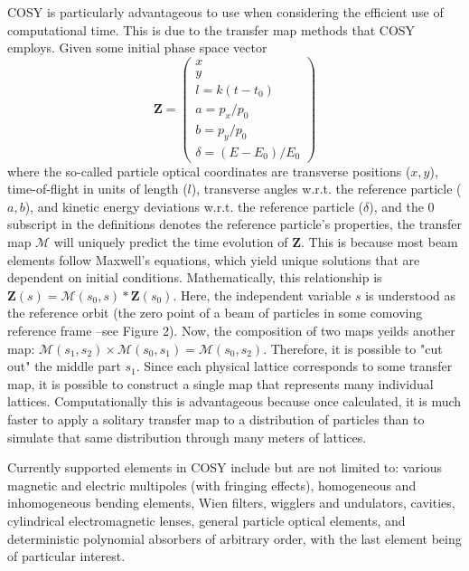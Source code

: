 \documentclass{jacow}
\begin{document}
COSY is particularly advantageous to use when considering the efficient use of computational time. This is due to the transfer map methods that COSY employs. Given some initial phase space vector
\begin{equation}
\mathbf{Z}=
\begin{pmatrix}
x\\ y\\ l=k(t-t_0)\\a=p_x/p_0\\b=p_y/p_0\\  \delta = (E-E_0)/E_0
\end{pmatrix}
\end{equation}
where the so-called particle optical coordinates are transverse positions ($x, y$), time-of-flight in units of length ($l$), transverse angles w.r.t. the reference particle ($a, b$), and kinetic energy deviations w.r.t. the reference particle ($\delta$), and the $0$ subscript in the definitions denotes the reference particle's properties, the transfer map $\mathcal{M}$ will uniquely predict the time evolution of $\mathbf{Z}$. This is because most beam elements follow Maxwell's equations, which yield unique solutions that are dependent on initial conditions. Mathematically, this relationship is $\mathbf{Z}(s)=\mathcal{M}(s_0 , s)*\mathbf{Z}(s_0)$. Here, the independent variable $s$ is understood as the reference orbit (the zero point of a beam of particles in some comoving reference frame --see Figure 2). Now, the composition of two maps yeilds another map: $\mathcal{M}(s_1 , s_2)\times \mathcal{M}(s_0 , s_1) = \mathcal{M}(s_0 , s_2)$. Therefore, it is possible to "cut out" the middle part $s_1$. Since each physical lattice corresponds to some transfer map, it is possible to construct a single map that represents many individual lattices. Computationally this is advantageous because once calculated, it is much faster to apply a solitary transfer map to a distribution of particles than to simulate that same distribution through many meters of lattices.
\par


Currently supported elements in COSY include but are not limited to: various magnetic and electric multipoles (with fringing effects), homogeneous and inhomogeneous bending elements, Wien filters, wigglers and undulators, cavities, cylindrical electromagnetic lenses, general particle optical elements, and deterministic polynomial absorbers of arbitrary order, with the last element being of particular interest. \par
\end{document}
